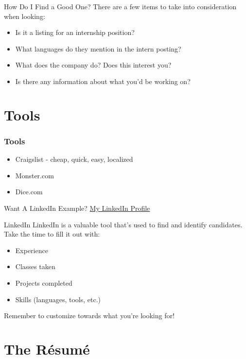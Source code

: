 \documentclass{beamer}
\begin{document}
\begin{frame}{How Do I Find a Good One?}
  There are a few items to take into consideration when looking:
  \begin{itemize}
    \item Is it a listing for an internship position?
    \item What languages do they mention in the intern posting?
    \item What does the company do? Does this interest you?
    \item Is there any information about what you'd be working on?
  \end{itemize}
\end{frame}


\section{Tools}
\begin{frame}\frametitle{Tools}

\begin{itemize}
  \item Craigslist - cheap, quick, easy, localized
  \item Monster.com
  \item Dice.com
\end{itemize}
\vfill
  \begin{block}{Want A LinkedIn Example?}
  \href{http://www.linkedin.com/profile/view?id=55354275}{My LinkedIn Profile}
  \end{block}
\end{frame}

\begin{frame}{LinkedIn}
  LinkedIn is a valuable tool that's used to find and identify
  candidates. \\
  \vfill
  Take the time to fill it out with:
  \begin{itemize}
    \item Experience
    \item Classes taken
    \item Projects completed
    \item Skills (languages, tools, etc.)
  \end{itemize}
  \vfill
  Remember to customize towards what you're looking for!

\end{frame}

\section{The R\'esum\'e}
\end{document}
